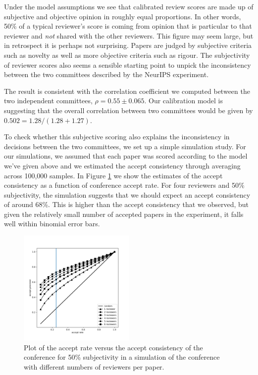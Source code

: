 \documentclass[twoside]{article}
\begin{document}
Under the model assumptions we see that calibrated review scores are
made up of subjective and objective opinion in roughly equal
proportions. In other words, 50\% of a typical reviewer's score is
coming from opinion that is particular to that reviewer and \emph{not}
shared with the other reviewers. This figure may seem large, but in
retrospect it is perhaps not surprising. Papers are judged by
subjective criteria such as novelty as well as more objective criteria
such as rigour. The subjectivity of reviewer scores also seems a
sensible starting point to unpick the inconsistency between the two
committees described by the NeurIPS experiment. 


The result is
consistent with the correlation coefficient we computed between the
two independent committees, $\rho = 0.55 \pm 0.065$. Our calibration
model is suggesting that the overall correlation between two
committees would be given by $0.502 = 1.28/(1.28+1.27)$.

To check whether this subjective scoring also explains the
inconsistency in decisions between the two committees, we set up a
simple simulation study. For our simulations, we assumed that each
paper was scored according to the model we've given above and we
estimated the accept consistency through averaging across 100,000
samples. In Figure \ref{figure-consistency-vs-accept-rate} we show the
estimates of the accept consistency as a function of conference accept
rate. For four reviewers and 50\% subjectivity, the simulation
suggests that we should expect an accept consistency of around
68\%. This is higher than the accept consistency that we observed, but
given the relatively small number of accepted papers in the
experiment, it falls well within binomial error bars.

\begin{figure}[htb]
\includegraphics[width=0.50\textwidth]{diagrams/neurips/accept-precision-vs-accept-rate.pdf}

\caption{Plot of the accept rate versus the accept consistency of
the conference for 50\% subjectivity in a simulation of the conference with different numbers of reviewers per paper.}
\label{figure-consistency-vs-accept-rate}
\end{figure}
\end{document}
